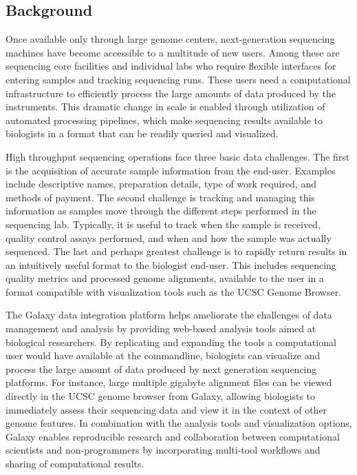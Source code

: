 \documentclass[10pt]{bmc_article}
\newenvironment{bmcformat}{\begin{raggedright}\baselineskip20pt\sloppy\setboolean{publ}{false}}{\end{raggedright}\baselineskip20pt\sloppy}
\begin{document}
\begin{bmcformat}

\section*{Background}

Once available only through large genome centers, next-generation
sequencing machines have become accessible to a multitude of new
users. Among these are sequencing core facilities and individual labs
who require flexible interfaces for entering samples and tracking
sequencing runs. These users need a computational infrastructure to
efficiently process the large amounts of data produced by the
instruments. This dramatic change in scale is enabled through
utilization of automated processing pipelines, which make sequencing
results available to biologists in a format that can be readily
queried and visualized.

High throughput sequencing operations face three basic data
challenges. The first is the acquisition of accurate sample
information from the end-user. Examples include descriptive names,
preparation details, type of work required, and methods of
payment. The second challenge is tracking and managing this
information as samples move through the different steps performed in
the sequencing lab. Typically, it is useful to track when the sample
is received, quality control assays performed, and when and how the
sample was actually sequenced. The last and perhaps greatest challenge
is to rapidly return results in an intuitively useful format to the
biologist end-user.  This includes sequencing quality metrics and
processed genome alignments, available to the user in a format
compatible with visualization tools such as the UCSC Genome Browser.

The Galaxy data integration platform \cite{goecks_galaxy:_2010} helps
ameliorate the challenges of data management and analysis by providing web-based
analysis tools aimed at biological researchers. By replicating and
expanding the tools a computational user would have available at the
commandline, biologists can visualize and process the large amount of
data produced by next generation sequencing platforms. For instance,
large multiple gigabyte alignment files can be viewed directly in the
UCSC genome browser \cite{fujita_ucsc_2011} from Galaxy, allowing
biologists to immediately assess their sequencing data and view it in the context of
other genome features. In combination with the analysis tools and
visualization options, Galaxy enables reproducible research and
collaboration between computational scientists and non-programmers by
incorporating multi-tool workflows and sharing of computational results.


\end{bmcformat}
\end{document}
